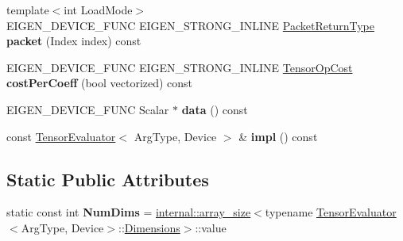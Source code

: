 \begin{DoxyCompactItemize}
{\footnotesize template$<$int Load\+Mode$>$ }\\E\+I\+G\+E\+N\+\_\+\+D\+E\+V\+I\+C\+E\+\_\+\+F\+U\+NC E\+I\+G\+E\+N\+\_\+\+S\+T\+R\+O\+N\+G\+\_\+\+I\+N\+L\+I\+NE \hyperlink{group___sparse_core___module}{Packet\+Return\+Type} {\bfseries packet} (Index index) const
\item 
\mbox{\label{struct_eigen_1_1_tensor_evaluator_3_01const_01_tensor_layout_swap_op_3_01_arg_type_01_4_00_01_device_01_4_a6c02ab457bd164d7e03536af52919a2d}} 
E\+I\+G\+E\+N\+\_\+\+D\+E\+V\+I\+C\+E\+\_\+\+F\+U\+NC E\+I\+G\+E\+N\+\_\+\+S\+T\+R\+O\+N\+G\+\_\+\+I\+N\+L\+I\+NE \hyperlink{class_eigen_1_1_tensor_op_cost}{Tensor\+Op\+Cost} {\bfseries cost\+Per\+Coeff} (bool vectorized) const
\item 
\mbox{\label{struct_eigen_1_1_tensor_evaluator_3_01const_01_tensor_layout_swap_op_3_01_arg_type_01_4_00_01_device_01_4_a96410830886fe5f423e6543a2724387f}} 
E\+I\+G\+E\+N\+\_\+\+D\+E\+V\+I\+C\+E\+\_\+\+F\+U\+NC Scalar $\ast$ {\bfseries data} () const
\item 
\mbox{\label{struct_eigen_1_1_tensor_evaluator_3_01const_01_tensor_layout_swap_op_3_01_arg_type_01_4_00_01_device_01_4_abce09b02620cba0bca96f72d35189f5c}} 
const \hyperlink{struct_eigen_1_1_tensor_evaluator}{Tensor\+Evaluator}$<$ Arg\+Type, Device $>$ \& {\bfseries impl} () const
\end{DoxyCompactItemize}
\subsection*{Static Public Attributes}
\begin{DoxyCompactItemize}
\item 
\mbox{\label{struct_eigen_1_1_tensor_evaluator_3_01const_01_tensor_layout_swap_op_3_01_arg_type_01_4_00_01_device_01_4_a105c5f57c660dd9effec7f9ece95dfbf}} 
static const int {\bfseries Num\+Dims} = \hyperlink{struct_eigen_1_1internal_1_1array__size}{internal\+::array\+\_\+size}$<$typename \hyperlink{struct_eigen_1_1_tensor_evaluator}{Tensor\+Evaluator}$<$Arg\+Type, Device$>$\+::\hyperlink{struct_eigen_1_1_d_sizes}{Dimensions}$>$\+::value
\end{DoxyCompactItemize}
